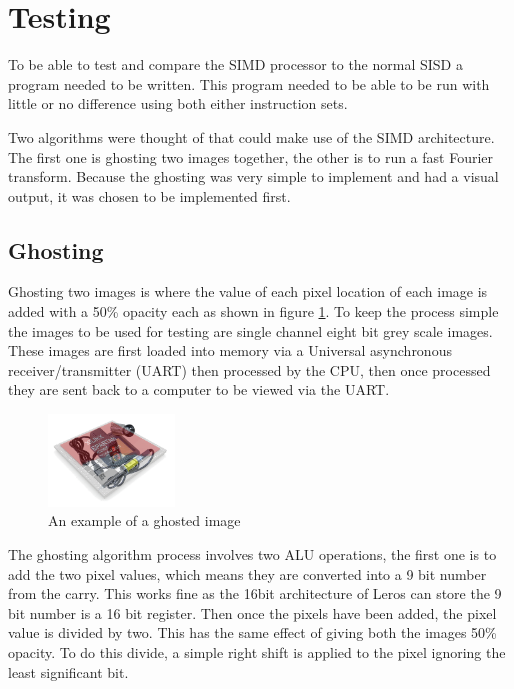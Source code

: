\section{Testing}

To be able to test and compare the SIMD processor to the normal SISD a program
needed to be written. This program needed to be able to be run with little or no
difference using both either instruction sets.

Two algorithms were thought of that could make use of the SIMD architecture.
The first one is ghosting two images together, the other is to run a fast
Fourier transform. Because the ghosting was very simple to implement and had a
visual output, it was chosen to be implemented first.

\subsection{Ghosting}
  Ghosting two images is where the value of each pixel location of each image is
  added with a 50\% opacity each as shown in figure \ref{ghosting}. To keep the
  process simple the images to be used for testing are single channel eight bit
  grey scale images. These images are first loaded into memory via a Universal
  asynchronous receiver/transmitter (UART) then processed by the CPU,
  then once processed they are sent back to a computer to be viewed via the UART.

  \begin{figure}[h!]
  \centering
  \includegraphics[width=0.3\textwidth]{images/ghosted}
  \caption{An example of a ghosted image}
  \label{ghosting}
  \end{figure}

  The ghosting algorithm process involves two ALU operations, the first one is
  to add the two pixel values, which means they are converted into a 9 bit
  number from the carry. This works fine as the 16bit architecture of Leros can
  store the 9 bit number is a 16 bit register. Then once the pixels have been
  added, the pixel value is divided by two. This has the same effect of giving
  both the images 50\% opacity. To do this divide, a simple right shift is
  applied to the pixel ignoring the least significant bit.

